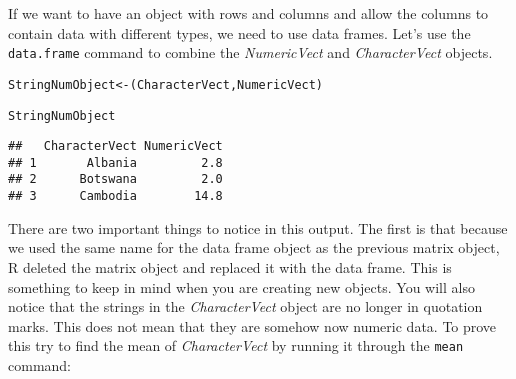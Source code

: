 
If we want to have an object with rows and columns and allow the columns to contain data with different types, we need to use data frames. Let's use the \texttt{data.frame} command to combine the {\emph{NumericVect}} and {\emph{CharacterVect}} objects.

\begin{knitrout}
\color{fgcolor}\begin{kframe}
\begin{alltt}
StringNumObject <- (CharacterVect, NumericVect)

StringNumObject
\end{alltt}
\begin{verbatim}
##   CharacterVect NumericVect
## 1       Albania         2.8
## 2      Botswana         2.0
## 3      Cambodia        14.8
\end{verbatim}
\end{kframe}
\end{knitrout}


\noindent There are two important things to notice in this output. The first is that because we used the same name for the data frame object as the previous matrix object, R deleted the matrix object and replaced it with the data frame. This is something to keep in mind when you are creating new objects. You will also notice that the strings in the {\emph{CharacterVect}} object are no longer in quotation marks. This does not mean that they are somehow now numeric data. To prove this try to find the mean of {\emph{CharacterVect}} by running it through the \texttt{mean} command:

\begin{knitrout}
\color{fgcolor}
\end{knitrout}


